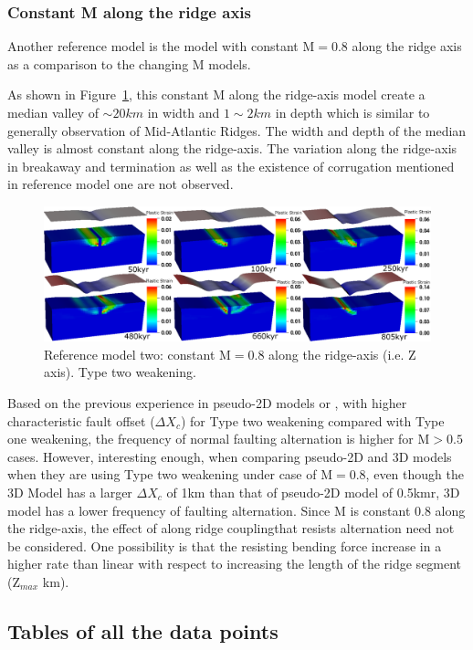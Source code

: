 \subsubsection{Constant M along the ridge axis }
Another reference model is the model with constant M$=0.8$ along the ridge axis as a comparison to the changing M models.

As shown in Figure~\ref{fig_Results1_3}, this constant M along the ridge-axis model create a median valley of $\sim 20km$ in width and $1\sim2km$ in depth which is similar to generally observation of Mid-Atlantic Ridges. The width and depth of the median valley is almost constant along the ridge-axis. The variation along the ridge-axis in breakaway and termination as well as the existence of corrugation mentioned in reference model one are not observed. 
\begin{figure}[hc]
  \centering
    \includegraphics[width=1.0\textwidth]{fig_Results1_3.eps}
  \caption{Reference model two: constant M$=0.8$ along the ridge-axis (i.e. Z axis). Type two weakening.}
 \label{fig_Results1_3}
\end{figure}   

Based on the previous experience in pseudo-2D models or \citep{Lavier2000}, with higher characteristic fault offset ($\Delta X_{c}$) for Type two weakening compared with Type one weakening, the frequency of normal faulting alternation is higher for M$>0.5$ cases. However, interesting enough, when comparing pseudo-2D and 3D models when they are using Type two weakening under case of M$=0.8$, even though the 3D Model has a larger $\Delta X_{c}$ of 1km than that of pseudo-2D model of 0.5kmr, 3D model has a lower frequency of faulting alternation. Since M is constant 0.8 along the ridge-axis, the effect of along ridge couplingthat resists alternation need not be considered. One possibility is that the resisting bending force increase in a higher rate than linear with respect to increasing the length of the ridge segment (Z$_{max}$ km).  

\subsection{Tables of all the data points}

